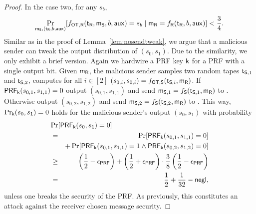 \begin{proof}
In the case two, for any $s_b$,
$$
\Pr_{\mathsf{m}_{\mathsf{S}}, (\mathsf{t}_{\mathsf{R}},b,\mathsf{aux})}[f_{\mathsf{OT},\mathsf{R}}(\mathsf{t}_{\mathsf{R}},\mathsf{m}_{\mathsf{S}},b,\mathsf{aux})=s_b\mid \mathsf{m}_{\mathsf{R}}=f_{\mathsf{R}}(\mathsf{t}_{\mathsf{R}},b,\mathsf{aux})]<\frac{3}{4}.
$$
Similar as in the proof of Lemma~\ref{lem:nosendtweak}, we argue that a malicious sender can tweak the output distribution of $(s_0,s_1)$. Due to the similarity, we only exhibit a brief version. Again we hardwire a PRF key $\mathsf{k}$ for a PRF with a single output bit. Given $\mathsf{m}_{\mathsf{R}}$, the malicious sender samples two random tapes $\mathsf{t}_{\mathsf{S}, 1}$ and $\mathsf{t}_{\mathsf{S},2}$, computes for all $i\in[2]$ $(s_{0,i},s_{0,i})=f_{\mathsf{OT},\mathsf{S}}(\mathsf{t}_{\mathsf{S},i},\mathsf{m}_{\mathsf{R}})$. If $\mathsf{PRF}_{\mathsf{k}}(s_{0,1},s_{1,1})=0$ output $(s_{0,1},s_{1,1})$ and send $\mathsf{m}_{\mathsf{S},1}=f_{\mathsf{S}}(\mathsf{t}_{\mathsf{S},1},\mathsf{m}_{\mathsf{R}})$ to \rec. Otherwise output $(s_{0,2},s_{1,2})$ and send $\mathsf{m}_{\mathsf{S},2}=f_{\mathsf{S}}(\mathsf{t}_{\mathsf{S},2},\mathsf{m}_{\mathsf{R}})$ to \rec. This way, $\Pr_{\mathsf{k}}(s_0,s_1)=0$ holds for the malicious sender's output $(s_0,s_1)$ with probability 
\begin{eqnarray*}
\lefteqn{\Pr[\PRF_{\key}(s_0,s_1)=0]}\\
&=&\Pr[\PRF_{\key}(s_{0,1},s_{1,1})=0]\\
&&+\Pr[\PRF_{\key}(s_{0,1},s_{1,1})=1\wedge\PRF_{\key}(s_{0,2},s_{1,2})=0]\\
&\geq&  \left(\frac{1}{2}-\epsilon_{\PRF}\right)+\left(\frac{1}{2}+\epsilon_{\PRF}\right)\cdot\frac{3}{8}\left(\frac{1}{2}-\epsilon_{\PRF}\right)\\
&=& \frac{1}{2}+\frac{1}{32}-\negl,
\end{eqnarray*}
unless one breaks the security of the PRF. As previously, this constitutes an attack against the receiver chosen message security.
\pe
\end{proof}


